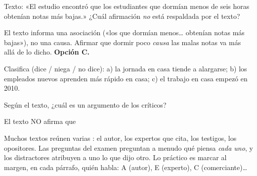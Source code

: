 \begin{reto}
Texto: «El estudio encontró que los estudiantes que dormían menos de seis horas obtenían notas más bajas.» ¿Cuál afirmación
\emph{no} está respaldada por el texto?
\end{reto}

\begin{retoresuelto}
El texto informa una asociación («los que dormían menos… obtenían notas más bajas»), no una causa. Afirmar que dormir poco
\emph{causa} las malas notas va más allá de lo dicho. \textbf{Opción C.}
\end{retoresuelto}

\taller
{}
\begin{ejercicios}
\item Clasifica (dice / niega / no dice): a) la jornada en casa tiende a alargarse; b) los empleados nuevos aprenden más rápido en casa; c) el trabajo en casa empezó en 2010. 
\end{ejercicios}
\begin{ejercicios}
\item Según el texto, ¿cuál es un argumento de los críticos?
\item El texto NO afirma que
\end{ejercicios}

\bitacora


Muchos textos reúnen varias : el autor, los expertos que cita, los testigos, los opositores. Las preguntas
del examen preguntan a menudo qué piensa \emph{cada uno}, y los distractores atribuyen a uno lo que dijo otro. Lo práctico
es marcar al margen, en cada párrafo, quién habla: A (autor), E (experto), C (comerciante)…

